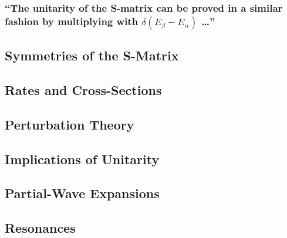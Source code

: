 \subsubsection{\enquote{The unitarity of the S-matrix can be proved in a similar fashion by multiplying  with $\delta\left(E_\beta-E_\alpha\right)$ \dots} }
\todo

\subsection{Symmetries of the S-Matrix}\label{susec:3_3}



\subsection{Rates and Cross-Sections}\label{susec:3_4}



\subsection{Perturbation Theory}\label{susec:3_5}



\subsection{Implications of Unitarity}\label{susec:3_6}



\subsection{Partial-Wave Expansions}\label{susec:3_7}



\subsection{Resonances}\label{susec:3_8}
